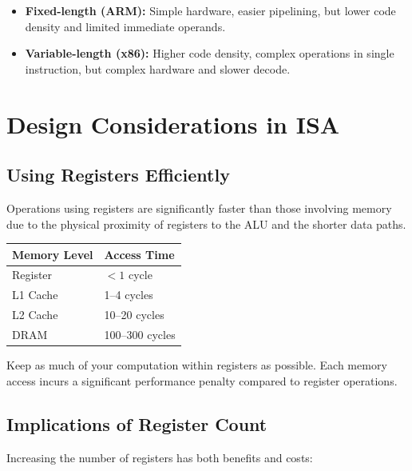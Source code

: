 \documentclass[11pt, a4paper, notitlepage]{report}
\theoremstyle{definition}
\theoremstyle{remark}
\theoremstyle{definition}
\begin{document}
\begin{keyresult}[title={Fixed vs.\ Variable Length}]
\begin{itemize}
  \item \textbf{Fixed-length (ARM):} Simple hardware, easier pipelining, but lower code density and limited immediate operands.
  \item \textbf{Variable-length (x86):} Higher code density, complex operations in single instruction, but complex hardware and slower decode.
\end{itemize}
\end{keyresult}

\section{Design Considerations in ISA}

\subsection{Using Registers Efficiently}

Operations using registers are significantly faster than those involving memory due to the physical proximity of registers to the ALU and the shorter data paths.

\begin{center}
\begin{tabular}{ll}
\toprule
\textbf{Memory Level} & \textbf{Access Time} \\
\midrule
Register & $< 1$ cycle \\
L1 Cache & 1--4 cycles \\
L2 Cache & 10--20 cycles \\
DRAM & 100--300 cycles \\
\bottomrule
\end{tabular}
\end{center}

\begin{keyresult}[title={Minimise Memory Access}]
Keep as much of your computation within registers as possible. Each memory access incurs a significant performance penalty compared to register operations.
\end{keyresult}

\subsection{Implications of Register Count}

Increasing the number of registers has both benefits and costs:
\end{document}
